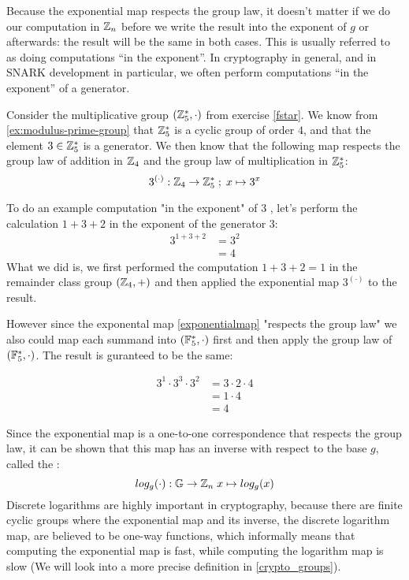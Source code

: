 Because the exponential map respects the group law, it doesn't matter if we do our computation in $\mathbb{Z}_n$ before we write the result into the exponent of $g$ or afterwards: the result will be the same in both cases. This is usually referred to as doing computations ``in the exponent''. In cryptography in general, and in SNARK development in particular, we often perform computations ``in the exponent'' of a generator.
\begin{example}\label{ex:in-the-exponent} Consider the multiplicative group $(\mathbb{Z}_{5}^*,\cdot)$ from exercise \ref{fstar}. We know from \ref{ex:modulus-prime-group} that $\mathbb{Z}_{5}^*$ is a cyclic group of order $4$, and that the element $3\in\mathbb{Z}_5^*$ is a generator. We then know that the following map respects the group law of addition in $\mathbb{Z}_4$ and the group law of multiplication in $\mathbb{Z}_5^*$:
$$
3^{(\cdot)}: \mathbb{Z}_4 \to \mathbb{Z}_5^* \;;\; x \mapsto 3^x
$$

To do an example computation "in the exponent" of $3$ , let's perform the calculation  $1+3+2$ in the exponent of the generator $3$:
\begin{align*}
3^{1+3+2} &=3^{2}\\
          & = 4
\end{align*}
What we did is, we first performed the computation $1+3+2=1$ in the remainder class group $(\mathbb{Z}_4,+)$ and then applied the exponential map $3^{(\cdot)}$ to the result. 

However since the exponental map \ref{exponentialmap} "respects the group law" we also could map each summand into $(\mathbb{F}_5^*,\cdot)$ first and then apply the group law of $(\mathbb{F}_5^*,\cdot)$. The result is guranteed to be the same:

\begin{align*}
3^1 \cdot 3^3 \cdot 3^{2}
          & = 3\cdot 2 \cdot 4\\
          & = 1\cdot 4\\
          & = 4
\end{align*}
\end{example}
Since the exponential map is a one-to-one correspondence that respects the group law, it can be shown that this map has an inverse with respect to the base $g$, called the :
\begin{equation}
log_g(\cdot): \mathbb{G} \to \mathbb{Z}_n\; x \mapsto log_g(x)
\end{equation}
Discrete logarithms are highly important in cryptography, because there are finite cyclic groups where the exponential map and its inverse, the discrete logarithm map, are believed to be one-way functions, which informally means that computing the exponential map is fast, while computing the logarithm map is slow (We will look into a more precise definition in \ref{crypto_groups}).
